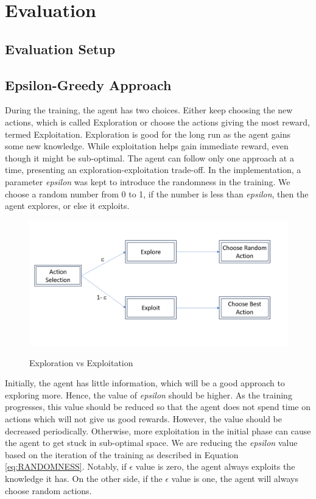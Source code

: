 \documentclass[logo,msc]{infthesis}           %
\begin{document}
\chapter{Evaluation}

\section{Evaluation Setup}

\section{Epsilon-Greedy Approach}

During the training, the agent has two choices. Either keep choosing the new actions, which is called Exploration or choose the actions giving the most reward, termed Exploitation. Exploration is good for the long run as the agent gains some new knowledge. While exploitation helps gain immediate reward, even though it might be sub-optimal. The agent can follow only one approach at a time, presenting an exploration-exploitation trade-off. In the implementation, a parameter \textit{epsilon} was kept to introduce the randomness in the training. We choose a random number from 0 to 1, if the number is less than \textit{epsilon}, then the agent explores, or else it exploits.

\begin{figure}[htbp]
  \centering
  \includegraphics[width=\textwidth]{Images/Randomness.png}
  \label{fig:randomness}  
  \caption{Exploration vs Exploitation}
\end{figure}

Initially, the agent has little information, which will be a good approach to exploring more. Hence, the value of \textit{epsilon} should be higher. As the training progresses, this value should be reduced so that the agent does not spend time on actions which will not give us good rewards. However, the value should be decreased periodically. Otherwise, more exploitation in the initial phase can cause the agent to get stuck in sub-optimal space. We are reducing the \textit{epsilon} value based on the iteration of the training as described in Equation \ref{eq:RANDOMNESS}. Notably, if {$\epsilon$} value is zero, the agent always exploits the knowledge it has. On the other side, if the {$\epsilon$} value is one, the agent will always choose random actions.
\end{document}

